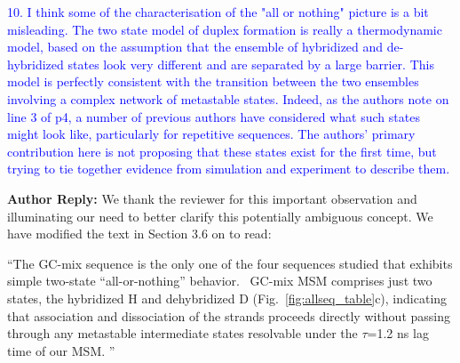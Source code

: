 \documentclass[11pt,a4paper]{letter} %
\newcommand*{\rood}[1]{{\color{red}{#1}}}
\newcommand*{\noteg}[1]{\textcolor{green}{[[#1]]}}		%
\newcommand*{\noter}[1]{{\color{red}{[[#1]]}}}
\begin{document}
\textcolor{blue}{10. I think some of the characterisation of the "all or nothing" picture is a bit misleading. The two state model of duplex formation is really a thermodynamic model, based on the assumption that the ensemble of hybridized and de-hybridized states look very different and are separated by a large barrier. This model is perfectly consistent with the transition between the two ensembles involving a complex network of metastable states. Indeed, as the authors note on line 3 of p4, a number of previous authors have considered what such states might look like, particularly for repetitive sequences. The authors' primary contribution here is not proposing that these states exist for the first time, but trying to tie together evidence from simulation and experiment to describe them.}


\textbf{Author Reply:}   We thank the reviewer for this important observation and illuminating our need to better clarify this potentially ambiguous concept. We have modified the text in Section 3.6 on \rood{p.~29} to read:

\noter{What do you think of this? Does this answer the question?}
``The GC-mix sequence is the only one of the four sequences studied that exhibits simple two-state ``all-or-nothing'' behavior.~\citep{Xiao2019, Araque2016LatticeCooperativity, Sikora2013ModelingIntermediates, Sanstead2016} \rood{This characterization is intended to reflect that the mechanistic observation that} GC-mix MSM comprises just two states, the hybridized H and dehybridized D (Fig.~\ref{fig:allseq_table}c), indicating that association and dissociation of the strands proceeds directly without passing through any metastable intermediate states resolvable under the $\tau$=1.2 ns lag time of our MSM. \rood{(We note that ``all-or-nothing'' can also be used, somewhat ambiguously, to refer to a two-state thermodynamic model where the hybridized and dehybridized are separated by a large free energy barrier but that the transitions between them may proceed through a network of metastable states.)}''
\end{document}
